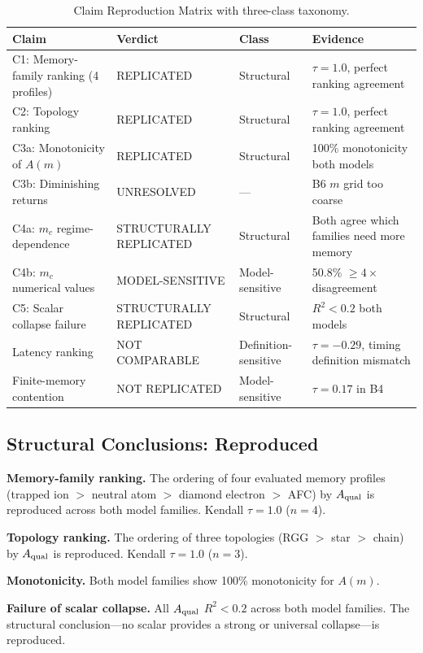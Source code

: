 \documentclass[aps,prapplied,reprint,superscriptaddress]{revtex4-2}
\newcommand{\Aqual}{A_{\rm qual}}
\begin{document}
\begin{table}[t]
\centering
\caption{Claim Reproduction Matrix with three-class taxonomy.}
\label{tab:claim_matrix}
\begin{tabular}{lp{3.5cm}p{2.8cm}p{3cm}}
\toprule
Claim & Verdict & Class & Evidence \\
\midrule
C1: Memory-family ranking (4 profiles) & REPLICATED & Structural & $\tau = 1.0$, perfect ranking agreement \\
C2: Topology ranking & REPLICATED & Structural & $\tau = 1.0$, perfect ranking agreement \\
C3a: Monotonicity of $A(m)$ & REPLICATED & Structural & 100\% monotonicity both models \\
C3b: Diminishing returns & UNRESOLVED & --- & B6 $m$ grid too coarse \\
C4a: $m_c$ regime-dependence & STRUCTURALLY REPLICATED & Structural & Both agree which families need more memory \\
C4b: $m_c$ numerical values & MODEL-SENSITIVE & Model-sensitive & 50.8\% $\geq 4\times$ disagreement \\
C5: Scalar collapse failure & STRUCTURALLY REPLICATED & Structural & $R^2 < 0.2$ both models \\
Latency ranking & NOT COMPARABLE & Definition-sensitive & $\tau = -0.29$, timing definition mismatch \\
Finite-memory contention & NOT REPLICATED & Model-sensitive & $\tau = 0.17$ in B4 \\
\bottomrule
\end{tabular}
\end{table}

\subsection{Structural Conclusions: Reproduced}

\textbf{Memory-family ranking.} The ordering of four evaluated memory profiles (trapped ion $>$ neutral atom $>$ diamond electron $>$ AFC) by $\Aqual$ is reproduced across both model families. Kendall $\tau = 1.0$ ($n = 4$).

\textbf{Topology ranking.} The ordering of three topologies (RGG $>$ star $>$ chain) by $\Aqual$ is reproduced. Kendall $\tau = 1.0$ ($n = 3$).

\textbf{Monotonicity.} Both model families show 100\% monotonicity for $A(m)$.

\textbf{Failure of scalar collapse.} All $\Aqual$ $R^2 < 0.2$ across both model families. The structural conclusion---no scalar provides a strong or universal collapse---is reproduced.
\end{document}
